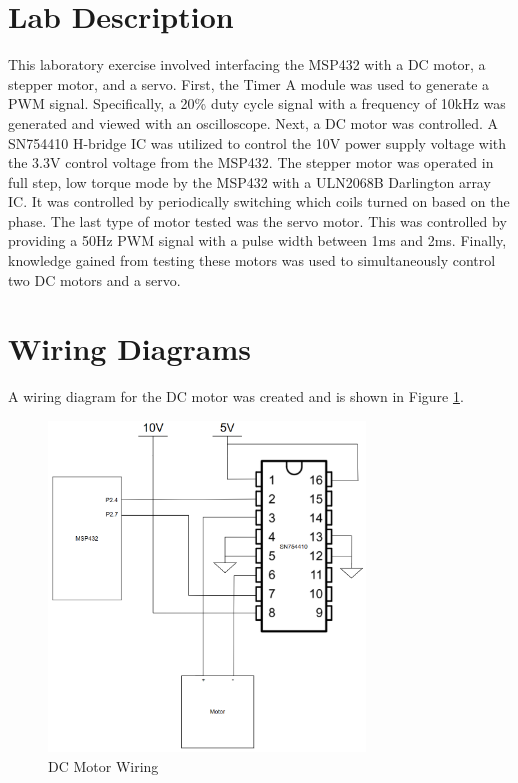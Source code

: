\documentclass[CMPE]{KGCOEReport}
\begin{document}
\maketitle

\section*{Lab Description}

This laboratory exercise involved interfacing the MSP432 with a DC motor, a stepper motor, and a servo. First, the Timer A module was used to generate a PWM signal. Specifically, a 20\% duty cycle signal with a frequency of 10kHz was generated and viewed with an oscilloscope. Next, a DC motor was controlled. A SN754410 H-bridge IC was utilized to control the 10V power supply voltage with the 3.3V control voltage from the MSP432. The stepper motor was operated in full step, low torque mode by the MSP432 with a ULN2068B Darlington array IC. It was controlled by periodically switching which coils turned on based on the phase. The last type of motor tested was the servo motor. This was controlled by providing a 50Hz PWM signal with a pulse width between 1ms and 2ms. Finally, knowledge gained from testing these motors was used to simultaneously control two DC motors and a servo.

\section*{Wiring Diagrams}

A wiring diagram for the DC motor was created and is shown in Figure \ref{fig:DCMotorWiring}.

\begin{figure}[H]
    \centering
    \includegraphics[width=0.75\textwidth]{DCMotorWiring.png}
    \caption{DC Motor Wiring}
    \label{fig:DCMotorWiring}
\end{figure}
\end{document}

